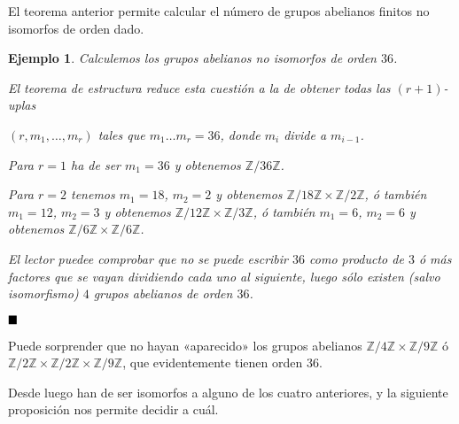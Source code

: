 \documentclass[12pt]{article}
\newtheorem{example}{Ejemplo}[theorem]
\begin{document}
El teorema anterior permite calcular el número de grupos abelianos finitos no isomorfos de orden dado.

\begin{example} Calculemos los grupos abelianos no isomorfos de orden $36$.

El teorema de estructura reduce esta cuestión a la de obtener todas las $(r+1)$-uplas\begin{center} $(r, m_{1}, \ldots, m_{r})$ tales que $m_{1} \ldots m_{r} = 36$, donde $m_{i}$ divide a $m_{i-1}$. \end{center}
Para $r = 1$ ha de ser $m_{1} = 36$ y obtenemos $\mathbb{Z}/36\mathbb{Z}$.

Para $r = 2$ tenemos $m_{1} = 18$, $m_{2} = 2$ y obtenemos $\mathbb{Z}/18\mathbb{Z} \times \mathbb{Z}/2\mathbb{Z}$, ó también $m_{1} = 12$, $m_{2} = 3$ y obtenemos $\mathbb{Z}/12\mathbb{Z} \times \mathbb{Z}/3\mathbb{Z}$, ó también $m_{1} = 6$, $m_{2} = 6$ y obtenemos $\mathbb{Z}/6\mathbb{Z} \times \mathbb{Z}/6\mathbb{Z}$.

El lector puedee comprobar que no se puede escribir $36$ como producto de $3$ ó más factores que se vayan dividiendo cada uno al siguiente, luego sólo existen (salvo isomorfismo) $4$ grupos abelianos de orden $36$.

\end{example}

$\hfill \blacksquare$

Puede sorprender que no hayan «aparecido» los grupos abelianos $\mathbb{Z}/4\mathbb{Z} \times \mathbb{Z}/9\mathbb{Z}$ ó $\mathbb{Z}/2\mathbb{Z} \times \mathbb{Z}/2\mathbb{Z} \times \mathbb{Z}/9\mathbb{Z}$, que evidentemente tienen orden $36$.

Desde luego han de ser isomorfos a alguno de los cuatro anteriores, y la siguiente proposición nos permite decidir a cuál.
\end{document}
